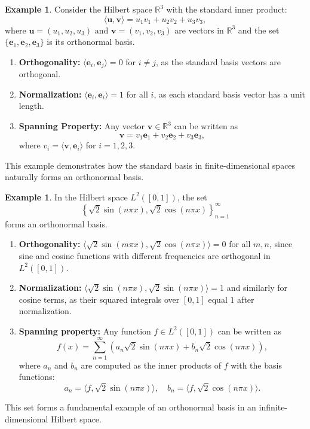 \documentclass[12pt, reqno]{amsart}
\theoremstyle{definition}
\newtheorem{example}[theorem]{Example}
\numberwithin{equation}{section}
\newcommand{\dR}{{\mathbb R}}
\begin{document}
\begin{example}
Consider the Hilbert space $\dR^3$ with the standard inner product:
\[
\langle \mathbf{u}, \mathbf{v} \rangle = u_1 v_1 + u_2 v_2 + u_3 v_3,
\]
where $\mathbf{u} = (u_1, u_2, u_3)$ and $\mathbf{v} = (v_1, v_2, v_3)$ are vectors in $\dR^3$ and the set $\{\mathbf{e}_1, \mathbf{e}_2, \mathbf{e}_3\}$ is its orthonormal basis.

\begin{enumerate}
    \item \textbf{Orthogonality:} $\langle \mathbf{e}_i, \mathbf{e}_j \rangle = 0$ for $i \neq j$, as the standard basis vectors are orthogonal.

    \item \textbf{Normalization:} $\langle \mathbf{e}_i, \mathbf{e}_i \rangle = 1$ for all $i$, as each standard basis vector has a unit length.

    \item \textbf{Spanning Property:} Any vector $\mathbf{v} \in \dR^3$ can be written as
    \[
    \mathbf{v} = v_1 \mathbf{e}_1 + v_2 \mathbf{e}_2 + v_3 \mathbf{e}_3,
    \]
    where $v_i = \langle \mathbf{v}, \mathbf{e}_i \rangle$ for $i = 1, 2, 3$.
\end{enumerate}

This example demonstrates how the standard basis in finite-dimensional spaces naturally forms an orthonormal basis.
\end{example}


\begin{example}
In the Hilbert space $L^2([0, 1])$, the set 
\[
\left\{\sqrt{2} \sin(n \pi x), \sqrt{2} \cos(n \pi x)\right\}_{n=1}^\infty
\]
forms an orthonormal basis.
\begin{enumerate}
    \item \textbf{Orthogonality:} $\langle \sqrt{2} \sin(m \pi x), \sqrt{2} \cos(n \pi x) \rangle = 0$ for all $m, n$, since sine and cosine functions with different frequencies are orthogonal in $L^2([0, 1])$.

    \item \textbf{Normalization:} $\langle \sqrt{2} \sin(n \pi x), \sqrt{2} \sin(n \pi x) \rangle = 1$ and similarly for cosine terms, as their squared integrals over $[0, 1]$ equal $1$ after normalization.

    \item \textbf{Spanning property:} Any function $f \in L^2([0, 1])$ can be written as
    \[
    f(x) = \sum_{n=1}^\infty \left( a_n \sqrt{2} \sin(n \pi x) + b_n \sqrt{2} \cos(n \pi x) \right),
    \]
    where $a_n$ and $b_n$ are computed as the inner products of $f$ with the basis functions:
    \[
    a_n = \langle f, \sqrt{2} \sin(n \pi x) \rangle, \quad b_n = \langle f, \sqrt{2} \cos(n \pi x) \rangle.
    \]
\end{enumerate}
This set forms a fundamental example of an orthonormal basis in an infinite-dimensional Hilbert space.
\end{example}
\end{document}
